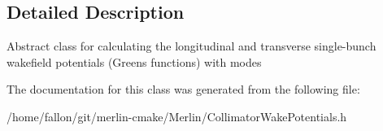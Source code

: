 \subsection{Detailed Description}
Abstract class for calculating the longitudinal and transverse single-\/bunch wakefield potentials (Greens functions) with modes 

The documentation for this class was generated from the following file\+:\begin{DoxyCompactItemize}
\item 
/home/fallon/git/merlin-\/cmake/\+Merlin/Collimator\+Wake\+Potentials.\+h\end{DoxyCompactItemize}

